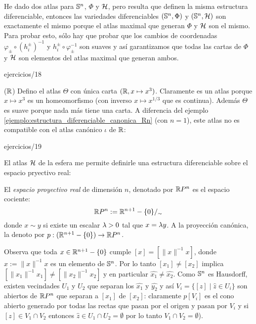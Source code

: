 \documentclass[../../topologia_algebraica]{subfiles}
\begin{document}
He dado dos atlas para $\mathbb{S}^n$, $\Phi$ y $\mathcal{H}$, pero resulta que definen la misma estructura
diferenciable, entonces las variedades diferenciables $(\mathbb{S}^n,\Phi)$ y $(\mathbb{S}^n,\mathcal{H})$ son exactamente
el mismo porque el atlas maximal que generan $\Phi$ y $\mathcal{H}$ son el mismo. Para probar esto, s\'olo
hay que probar que los cambios de coordenadas $\varphi_{\pm}\circ (h_i^{\pm})^{-1}$ y
$h_i^{\pm}\circ\varphi_{\pm}^{-1}$ son suaves y as\'i garantizamos que todas las cartas de $\Phi$ y
$\mathcal{H}$ son elementos del atlas maximal que generan ambos.

{ejercicios/18} %

\begin{ejemplo}($\mathbb{R}$) Defino el atlas $\Theta$ con \'unica carta $(\mathbb{R},x\mapsto x^3)$. Claramente
  es un atlas porque $x\mapsto x^3$ es un homeomorfismo (con inverso $x\mapsto x^{1/3}$ que es
  continua). Adem\'as $\Theta$ es suave porque nada m\'as tiene una carta. A diferencia del ejemplo
  \ref{ejemplo:estructura_diferenciable_canonica_Rn} (con $n=1$), este atlas no es compatible
  con el atlas can\'onico $\iota$ de $\mathbb{R}$:

  {ejercicios/19} %
\end{ejemplo}

El atlas $\mathcal{H}$ de la esfera me permite definirle una estructura diferenciable sobre el espacio
pryectivo real:

\begin{defin}
  El \emph{espacio proyectivo real} de dimensi\'on $n$, denotado por $\mathbb{R} P^n$ es el espacio
  cociente:
  \[
    \mathbb{R} P^n:=\mathbb{R}^{n+1}-\{0\}/_{\sim}
  \]
  donde $x\sim y$ si existe un escalar $\lambda>0$ tal que $x=\lambda y$. A la proyecci\'on can\'onica,
  la denoto por $p:(\mathbb{R}^{n+1}-\{0\})\rightarrow \mathbb{R} P^n$.
\end{defin}

Observa que toda $x\in\mathbb{R}^{n+1}-\{0\}$ cumple $[x]=[\|x\|^{-1}x]$, donde $\hat{x}:=\|x\|^{-1}x$
es un elemento de $\mathbb{S}^n$. Por lo tanto $[x_1]\neq[x_2]$ implica $[\|x_1\|^{-1}x_1]\neq[\|x_2\|^{-1}x_2]$ y
en particular $\hat{x_1}\neq\hat{x_2}$. Como $\mathbb{S}^n$ es Hausdorff, existen vecindades $U_1$ y $U_2$
que separan los $\hat{x_1}$ y $\hat{y_2}$ y as\'i $V_i=\{[z] \mid \hat{z}\in U_i\}$ son abiertos
de $\mathbb{R} P^n$ que separan a $[x_1]$ de $[x_2]$: claramente $p[V_i]$ es el cono abierto generado
por todas las rectas que pasan por el origen y pasan por $V_i$ y si $[z]\in V_1\cap V_2$ entonces
$\hat{z}\in U_1\cap U_2=\emptyset$ por lo tanto $V_1\cap V_2=\emptyset$).
\end{document}
